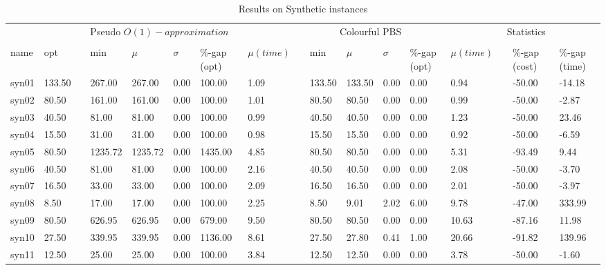 \begin{table}[H]
    \caption{Results on Synthetic instances}\label{table:synthetic_cost}
    \tiny
    \begin{tabularx}{\textwidth}{XXlXXXXXlXXXXXlXX}
    \firsthline
    \multicolumn{2}{c}{Instance}& \hspace{0.25em} & \multicolumn{5}{c}{Pseudo $O(1)-approximation$}& \hspace{0.25em} & \multicolumn{5}{c}{Colourful PBS}& \hspace{0.25em} & \multicolumn{2}{c}{Statistics}\\
    \cline{1-2} \cline{4-8} \cline{10-14} \cline{16-17}\\
    name & opt && min & $\mu$ & $\sigma$ & \%-gap (opt) & $\mu (time)$ && min & $\mu$ & $\sigma$ & \%-gap (opt) & $\mu (time)$ && \%-gap (cost) & \%-gap (time)\\
    \hline
    syn01 & 133.50 && 267.00 & 267.00 & 0.00 & 100.00 & 1.09 && 133.50 & 133.50 & 0.00 & 0.00 & 0.94 && -50.00 & -14.18\\
    syn02 & 80.50 && 161.00 & 161.00 & 0.00 & 100.00 & 1.01 && 80.50 & 80.50 & 0.00 & 0.00 & 0.99 && -50.00 & -2.87\\
    syn03 & 40.50 && 81.00 & 81.00 & 0.00 & 100.00 & 0.99 && 40.50 & 40.50 & 0.00 & 0.00 & 1.23 && -50.00 & 23.46\\
    syn04 & 15.50 && 31.00 & 31.00 & 0.00 & 100.00 & 0.98 && 15.50 & 15.50 & 0.00 & 0.00 & 0.92 && -50.00 & -6.59\\
    syn05 & 80.50 && 1235.72 & 1235.72 & 0.00 & 1435.00 & 4.85 && 80.50 & 80.50 & 0.00 & 0.00 & 5.31 && -93.49 & 9.44\\
    syn06 & 40.50 && 81.00 & 81.00 & 0.00 & 100.00 & 2.16 && 40.50 & 40.50 & 0.00 & 0.00 & 2.08 && -50.00 & -3.70\\
    syn07 & 16.50 && 33.00 & 33.00 & 0.00 & 100.00 & 2.09 && 16.50 & 16.50 & 0.00 & 0.00 & 2.01 && -50.00 & -3.97\\
    syn08 & 8.50 && 17.00 & 17.00 & 0.00 & 100.00 & 2.25 && 8.50 & 9.01 & 2.02 & 6.00 & 9.78 && -47.00 & 333.99\\
    syn09 & 80.50 && 626.95 & 626.95 & 0.00 & 679.00 & 9.50 && 80.50 & 80.50 & 0.00 & 0.00 & 10.63 && -87.16 & 11.98\\
    syn10 & 27.50 && 339.95 & 339.95 & 0.00 & 1136.00 & 8.61 && 27.50 & 27.80 & 0.41 & 1.00 & 20.66 && -91.82 & 139.96\\
    syn11 & 12.50 && 25.00 & 25.00 & 0.00 & 100.00 & 3.84 && 12.50 & 12.50 & 0.00 & 0.00 & 3.78 && -50.00 & -1.60\\

\end{tabularx}
\end{table}
